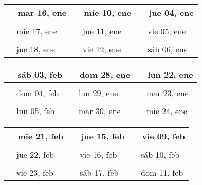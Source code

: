 \documentclass[letterpaper,10pt]{article}
\begin{document}
\begin{tabular}{lll}
\\
{\ \ mar 16, ene\hspace{4.5cm}\vspace{2.25cm}} &{\ \ mie 10, ene\hspace{4.5cm}} &{\ \ jue 04, ene\hspace{4.5cm}}
\\ \hline \\
{\ \ mie 17, ene\vspace{2.25cm}} & {\ \ jue 11, ene} & {\ \ vie 05, ene}
\\ \hline \\
{\ \ jue 18, ene\vspace{2.25cm}} & {\ \ vie 12, ene} & {\ \ sáb 06, ene}
\\
\end{tabular}\par
\begin{tabular}{lll}
\\
{\ \ sáb 03, feb\hspace{4.5cm}\vspace{2.25cm}} &{\ \ dom 28, ene\hspace{4.5cm}} &{\ \ lun 22, ene\hspace{4.5cm}}
\\ \hline \\
{\ \ dom 04, feb\vspace{2.25cm}} & {\ \ lun 29, ene} & {\ \ mar 23, ene}
\\ \hline \\
{\ \ lun 05, feb\vspace{2.25cm}} & {\ \ mar 30, ene} & {\ \ mie 24, ene}
\\
\end{tabular}\par
\begin{tabular}{lll}
\\
{\ \ mie 21, feb\hspace{4.5cm}\vspace{2.25cm}} &{\ \ jue 15, feb\hspace{4.5cm}} &{\ \ vie 09, feb\hspace{4.5cm}}
\\ \hline \\
{\ \ jue 22, feb\vspace{2.25cm}} & {\ \ vie 16, feb} & {\ \ sáb 10, feb}
\\ \hline \\
{\ \ vie 23, feb\vspace{2.25cm}} & {\ \ sáb 17, feb} & {\ \ dom 11, feb}
\\
\end{tabular}\par
\end{document}
